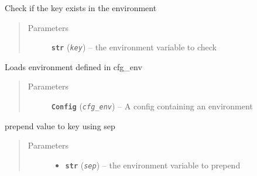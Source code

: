 \documentclass[a4paper,10pt,english]{sphinxmanual}
\begin{document}
\begin{fulllineitems}
\begin{fulllineitems}
\begin{quote}
\begin{description}
\end{description}\end{quote}

\end{fulllineitems}


\begin{fulllineitems}
\label{commands/apidoc/src:src.environment.SalomeEnviron.is_defined}
Check if the key exists in the environment
\begin{quote}\begin{description}
\item[{Parameters}] \leavevmode
\textbf{\texttt{str}} (\emph{\texttt{key}}) -- the environment variable to check

\end{description}\end{quote}

\end{fulllineitems}


\begin{fulllineitems}
\label{commands/apidoc/src:src.environment.SalomeEnviron.load_cfg_environment}
Loads environment defined in cfg\_env
\begin{quote}\begin{description}
\item[{Parameters}] \leavevmode
\textbf{\texttt{Config}} (\emph{\texttt{cfg\_env}}) -- A config containing an environment

\end{description}\end{quote}

\end{fulllineitems}


\begin{fulllineitems}
\label{commands/apidoc/src:src.environment.SalomeEnviron.prepend}
prepend value to key using sep
\begin{quote}\begin{description}
\item[{Parameters}] \leavevmode\begin{itemize}
\item {} 
\textbf{\texttt{str}} (\emph{\texttt{sep}}) -- the environment variable to prepend


\end{itemize}
\end{description}
\end{quote}
\end{fulllineitems}
\end{fulllineitems}
\end{document}
